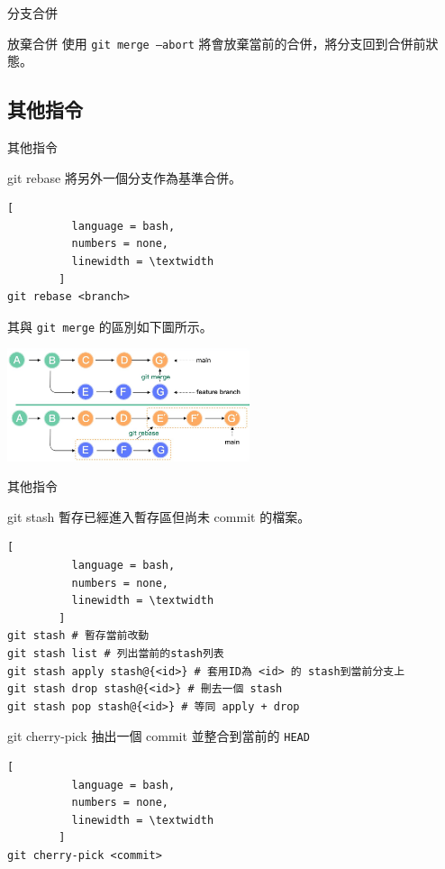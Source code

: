 \documentclass[xetex, unicode, 10pt, aspectratio=169]{beamer}
\begin{document}
\begin{frame}{分支合併}
    \begin{block}{放棄合併}
        使用 \texttt{git merge --abort} 將會放棄當前的合併，將分支回到合併前狀態。
    \end{block}
\end{frame}

\subsection{其他指令}

\begin{frame}[fragile]{其他指令}
    \begin{block}{git rebase}
        將另外一個分支作為基準合併。
        \begin{lstlisting}[
          language = bash,
          numbers = none,
          linewidth = \textwidth
        ]
git rebase <branch>\end{lstlisting}
        其與 \texttt{git merge} 的區別如下圖所示。
        \begin{center}
            \includegraphics[width=2.8in]{./img/git-merge-vs-git-rebase.png}
        \end{center}
    \end{block}
\end{frame}

\begin{frame}[fragile]{其他指令}
    \begin{block}{git stash}
        暫存已經進入暫存區但尚未 commit 的檔案。
        \begin{lstlisting}[
          language = bash,
          numbers = none,
          linewidth = \textwidth
        ]
git stash # 暫存當前改動
git stash list # 列出當前的stash列表
git stash apply stash@{<id>} # 套用ID為 <id> 的 stash到當前分支上
git stash drop stash@{<id>} # 刪去一個 stash
git stash pop stash@{<id>} # 等同 apply + drop\end{lstlisting}
    \end{block}
    \begin{block}{git cherry-pick}
        抽出一個 commit 並整合到當前的 \texttt{HEAD}
        \begin{lstlisting}[
          language = bash,
          numbers = none,
          linewidth = \textwidth
        ]
git cherry-pick <commit>\end{lstlisting}
    \end{block}
\end{frame}
\end{document}

